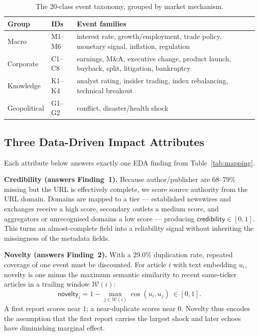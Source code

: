 \documentclass[sigconf,nonacm]{acmart}
\begin{document}
\begin{table}[t]
\caption{The 20-class event taxonomy, grouped by market mechanism.}
\label{tab:taxonomy}
\begin{tabular}{llp{4.0cm}}
\toprule
Group & IDs & Event families \\
\midrule
Macro        & M1--M6 & interest rate, growth/employment, trade policy,
                          monetary signal, inflation, regulation \\
Corporate    & C1--C8 & earnings, M\&A, executive change, product launch,
                          buyback, split, litigation, bankruptcy \\
Knowledge    & K1--K4 & analyst rating, insider trading, index
                          rebalancing, technical breakout \\
Geopolitical & G1--G2 & conflict, disaster/health shock \\
\bottomrule
\end{tabular}
\end{table}

\subsection{Three Data-Driven Impact Attributes}
\label{sec:attr}
Each attribute below answers exactly one EDA finding from
Table~\ref{tab:mapping}.

\textbf{Credibility (answers Finding~1).}
Because author/publisher are 68--79\% missing but the URL is effectively
complete, we score source authority from the URL domain. Domains are
mapped to a tier --- established newswires and exchanges receive a high
score, secondary outlets a medium score, and aggregators or unrecognised
domains a low score --- producing $\textsf{credibility}\in[0,1]$. This
turns an almost-complete field into a reliability signal without
inheriting the missingness of the metadata fields.

\textbf{Novelty (answers Finding~2).}
With a 29.0\% duplication rate, repeated coverage of one event must be
discounted. For article $i$ with text embedding $u_i$, novelty is one
minus the maximum semantic similarity to recent same-ticker articles in a
trailing window $\mathcal{W}(i)$:
\begin{equation}
\textsf{novelty}_i = 1-\max_{j\in\mathcal{W}(i)}\cos(u_i,u_j)\ \in[0,1].
\end{equation}
A first report scores near 1; a near-duplicate scores near 0. Novelty
thus encodes the assumption that the first report carries the largest
shock and later echoes have diminishing marginal effect.
\end{document}
